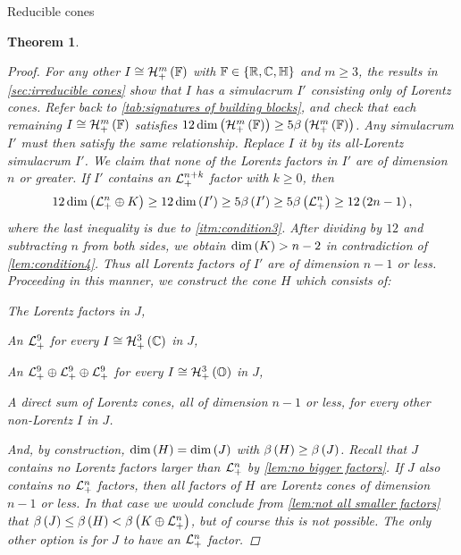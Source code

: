 \documentclass{interact}
\theoremstyle{plain}
\newtheorem{theorem}{Theorem}[section]
\theoremstyle{definition}
\theoremstyle{remark}
\begin{document}
\begin{section}{Reducible cones}
\begin{theorem}
\begin{proof}
        For any other $I \cong \Hnplus[m]\of{\Fn[1]}$ with $\Fn[1] \in
        \set{\Rn[1], \Cn[1], \quaternions}$ and $m \ge 3$, the results
        in \cref{sec:irreducible cones} show that $I$ has a simulacrum
        $I'$ consisting only of Lorentz cones. Refer back to
        \cref{tab:signatures of building blocks}, and check that each
        remaining $I \cong \Hnplus[m]\of{\Fn[1]}$ satisfies
        $12\dim\of{\Hnplus[m]\of{\Fn[1]}} \ge
        5\lyapunovrank{\Hnplus[m]\of{\Fn[1]}}$. Any simulacrum $I'$
        must then satisfy the same relationship. Replace $I$ it by its
        all-Lorentz simulacrum $I'$. We claim that none of the Lorentz
        factors in $I'$ are of dimension $n$ or greater. If $I'$
        contains an $\Lnplus[n+k]$ factor with $k \ge 0$, then
        \begin{equation*}
          12\dim\of{\directsum{\Lnplus}{K}}
          \ge
          12\dim\of{I'}
          \ge
          5\lyapunovrank{I'}
          \ge
          5\lyapunovrank{\Lnplus[n]}
          \ge
          12\qty{2n - 1},
        \end{equation*}
        where the last inequality is due to
        \cref{itm:condition3}. After dividing by $12$ and subtracting
        $n$ from both sides, we obtain $\dim\of{K} > n - 2$ in
        contradiction of \cref{lem:condition4}. Thus all Lorentz
        factors of $I'$ are of dimension $n-1$ or less. Proceeding in
        this manner, we construct the cone $H$ which consists of:
        \begin{itemize}
          \begin{item}
            The Lorentz factors in $J$,
          \end{item}
          \begin{item}
            An $\Lnplus[9]$ for every $I \cong \Hnplus[3]\of{\Cn[1]}$
            in $J$,
          \end{item}
          \begin{item}
            An $\Lnplus[9] \oplus \Lnplus[9] \oplus \Lnplus[9]$ for
            every $I \cong \Hnplus[3]\of{\octonions}$ in $J$,
          \end{item}
          \begin{item}
            A direct sum of Lorentz cones, all of dimension $n-1$ or
            less, for every other non-Lorentz $I$ in $J$.
          \end{item}
        \end{itemize}
        And, by construction, $\dim\of{H} = \dim\of{J}$ with
        $\lyapunovrank{H} \ge \lyapunovrank{J}$. Recall that $J$
        contains no Lorentz factors larger than $\Lnplus$ by
        \cref{lem:no bigger factors}. If $J$ also contains no
        $\Lnplus$ factors, then all factors of $H$ are Lorentz cones
        of dimension $n-1$ or less. In that case we would conclude
        from \cref{lem:not all smaller factors} that $\lyapunovrank{J}
        \le \lyapunovrank{H} < \lyapunovrank{\directsum{K}{\Lnplus}}$,
        but of course this is not possible. The only other option is
        for $J$ to have an $\Lnplus$ factor.


\end{proof}
\end{theorem}
\end{section}
\end{document}
